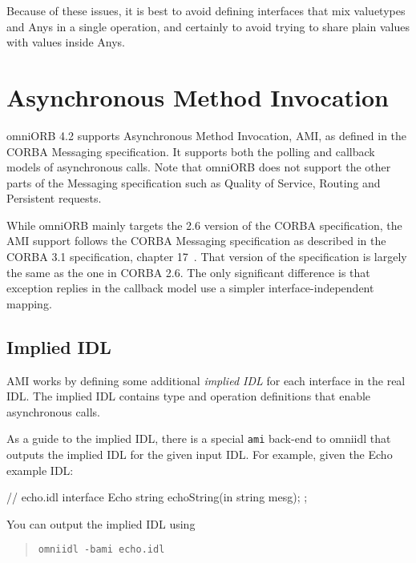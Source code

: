 \documentclass[11pt,oneside,a4paper]{book}
\newcommand{\cmdline}[1]{\texttt{#1}}
\newcommand{\term}[1]{\textit{#1}}
\begin{document}
Because of these issues, it is best to avoid defining interfaces that
mix valuetypes and Anys in a single operation, and certainly to avoid
trying to share plain values with values inside Anys.



\chapter{Asynchronous Method Invocation}
\label{chap:ami}

omniORB 4.2 supports Asynchronous Method Invocation, AMI, as defined
in the CORBA Messaging specification. It supports both the polling and
callback models of asynchronous calls. Note that omniORB does not
support the other parts of the Messaging specification such as Quality
of Service, Routing and Persistent requests.

While omniORB mainly targets the 2.6 version of the CORBA
specification, the AMI support follows the CORBA Messaging
specification as described in the CORBA 3.1 specification, chapter
17~\cite{corba31-spec}. That version of the specification is largely
the same as the one in CORBA 2.6. The only significant difference is
that exception replies in the callback model use a simpler
interface-independent mapping.

\section{Implied IDL}

AMI works by defining some additional \term{implied IDL} for each
interface in the real IDL. The implied IDL contains type and
operation definitions that enable asynchronous calls.

As a guide to the implied IDL, there is a special \cmdline{ami}
back-end to omniidl that outputs the implied IDL for the given input
IDL. For example, given the Echo example IDL:

\begin{idllisting}
// echo.idl
interface Echo {
  string echoString(in string mesg);
};
\end{idllisting}

\noindent You can output the implied IDL using

\begin{quote}
\cmdline{omniidl -bami echo.idl}
\end{quote}
\end{document}
